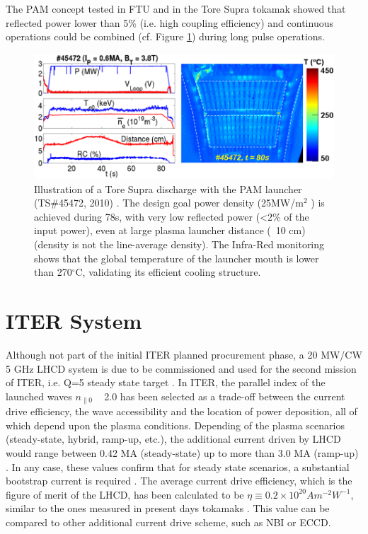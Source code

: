 The PAM concept tested in FTU and in the Tore Supra tokamak showed that reflected power lower than 5\% (i.e. high coupling efficiency) and continuous operations could be combined (cf. Figure \ref{fig:ts45472c4ir}) during long pulse operations. 
\begin{figure}
\centering
\includegraphics[width=0.9\linewidth]{Figures/LHCD/TS45472_C4_IR}
\caption{Illustration of a Tore Supra discharge with the PAM launcher (TS\#45472, 2010) \parencite{Ekedahl2010b}. The design goal power density (25MW/m$^2$ ) is achieved during 78s, with very low reflected power (<2\% of the input power), even at large plasma launcher distance (~10 cm) (density is not the line-average density). The Infra-Red monitoring shows that the global temperature of the launcher mouth is lower than 270$^{\circ}$C, validating its efficient cooling structure.}
\label{fig:ts45472c4ir}
\end{figure}


\section{ITER System}

Although not part of the initial ITER planned procurement phase, a 20 MW/CW 5 GHz LHCD system is due to be commissioned and used for the second mission of ITER, i.e. Q=5 steady state target \parencite{Hoang2009}. In ITER, the parallel index of the launched waves $n_{\parallel 0}$ ~ 2.0 has been selected as a trade-off between the current drive efficiency, the wave accessibility and the location of power deposition, all of which depend upon the plasma conditions. Depending of the plasma scenarios (steady-state, hybrid, ramp-up, etc.), the additional current driven by LHCD would range between 0.42 MA (steady-state) up to more than 3.0 MA (ramp-up) \parencite{Decker2011}. In any case, these values confirm that for steady state scenarios, a substantial bootstrap current is required \parencite{ITERPhysics_Chap6}. The average current drive efficiency, which is the figure of merit of the LHCD, has been calculated to be $\eta \equiv 0.2 \times 10^{20} A m^{-2} W^{-1}$, similar to the ones measured in present days tokamaks \parencite{ITERPhysics_Chap6}. This value can be compared to other additional current drive scheme, such as NBI or ECCD. 


